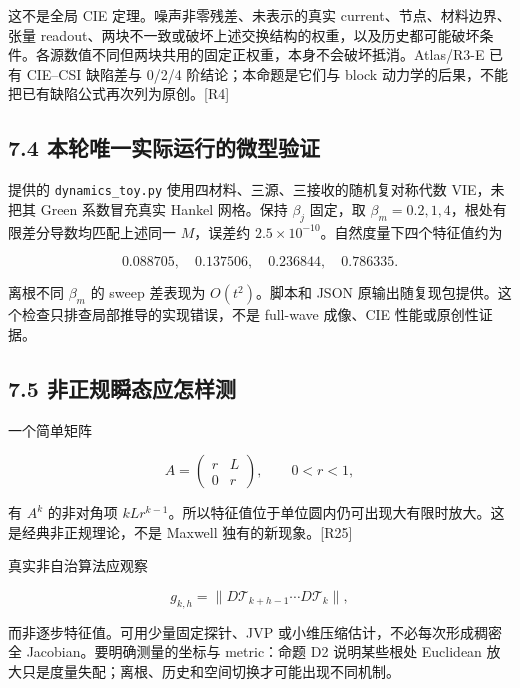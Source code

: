 \documentclass[11pt,a4paper]{article}
\begin{document}
这不是全局 CIE 定理。噪声非零残差、未表示的真实
current、节点、材料边界、张量
readout、两块不一致或破坏上述交换结构的权重，以及历史都可能破坏条件。各源数值不同但两块共用的固定正权重，本身不会破坏抵消。Atlas/R3-E
已有 CIE--CSI 缺陷差与 0/2/4 阶结论；本命题是它们与 block
动力学的后果，不能把已有缺陷公式再次列为原创。{[}R4{]}

\hypertarget{ux672cux8f6eux552fux4e00ux5b9eux9645ux8fd0ux884cux7684ux5faeux578bux9a8cux8bc1}{%
\subsection{7.4
本轮唯一实际运行的微型验证}\label{ux672cux8f6eux552fux4e00ux5b9eux9645ux8fd0ux884cux7684ux5faeux578bux9a8cux8bc1}}

提供的 \texttt{dynamics\_toy.py}
使用四材料、三源、三接收的随机复对称代数 VIE，未把其 Green 系数冒充真实
Hankel 网格。保持 \(\beta_j\) 固定，取
\(\beta_m=0.2,1,4\)，根处有限差分导数均匹配上述同一 \(M\)，误差约
\(2.5\times10^{-10}\)。自然度量下四个特征值约为

\[
0.088705,\quad0.137506,\quad0.236844,\quad0.786335.
\]

离根不同 \(\beta_m\) 的 sweep 差表现为 \(O(t^2)\)。脚本和 JSON
原输出随复现包提供。这个检查只排查局部推导的实现错误，不是 full-wave
成像、CIE 性能或原创性证据。

\hypertarget{ux975eux6b63ux89c4ux77acux6001ux5e94ux600eux6837ux6d4b}{%
\subsection{7.5
非正规瞬态应怎样测}\label{ux975eux6b63ux89c4ux77acux6001ux5e94ux600eux6837ux6d4b}}

一个简单矩阵

\[
A=\begin{pmatrix}r&L\\0&r\end{pmatrix},\qquad0<r<1,
\]

有 \(A^k\) 的非对角项
\(kLr^{k-1}\)。所以特征值位于单位圆内仍可出现大有限时放大。这是经典非正规理论，不是
Maxwell 独有的新现象。{[}R25{]}

真实非自治算法应观察

\[
g_{k,h}=\|D\mathcal T_{k+h-1}\cdots D\mathcal T_k\|,
\]

而非逐步特征值。可用少量固定探针、JVP 或小维压缩估计，不必每次形成稠密全
Jacobian。要明确测量的坐标与 metric：命题 D2 说明某些根处 Euclidean
放大只是度量失配；离根、历史和空间切换才可能出现不同机制。
\end{document}
